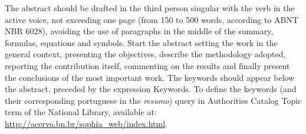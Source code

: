 
\begin{abstractutfpr}%
The abstract should be drafted in the third person singular with the verb in the active voice, not exceeding one page (from 150 to 500 words, according to ABNT NBR 6028), avoiding the use of paragraphs in the middle of the summary, formulas, equations and symbols. Start the abstract setting the work in the general context, presenting the objectives, describe the methodology adopted, reporting the contribution itself, commenting on the results and finally present the conclusions of the most important work. The keywords should appear below the abstract, preceded by the expression Keywords. To define the keywords (and their corresponding portuguese in the \textit{resumo}) query in Authorities Catalog Topic term of the National Library, available at: \url{http://acervo.bn.br/sophia_web/index.html}.
\end{abstractutfpr}
